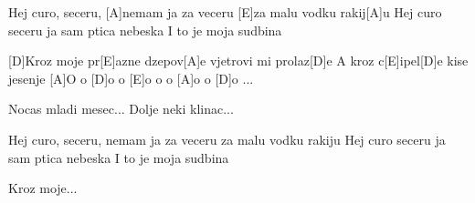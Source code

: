 \documentclass{article}
\begin{document}
\begin{multicols}{2}
\begin{guitar}
	[E]Hej curo, seceru, [A]nemam ja za veceru
	[E]za malu vodku rakij[A]u
	Hej curo seceru ja sam ptica nebeska
	I to je moja sudbina
	
	[D]Kroz moje pr[E]azne dzepov[A]e vjetrovi mi prolaz[D]e
	A kroz c[E]ipel[D]e kise jesenje
	[A]O o [D]o o [E]o  \qquad  [E]o o [A]o o [D]o ...
	
	Nocas mladi mesec...
	Dolje neki klinac...
	
	Hej curo, seceru, nemam ja za veceru
	za malu vodku rakiju
	Hej curo seceru ja sam ptica nebeska
	I to je moja sudbina
	
	Kroz moje...

	
\end{guitar}


\end{multicols}
\end{document}
